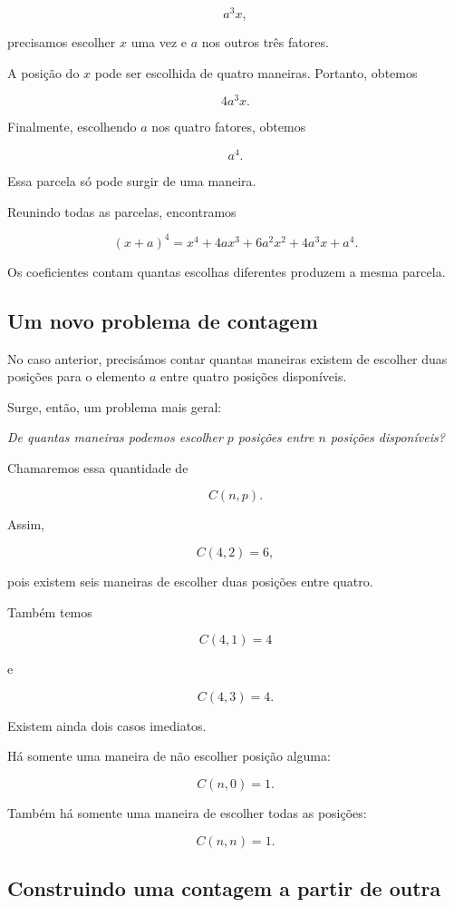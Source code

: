 \documentclass[12pt,a4paper]{article}
\begin{document}
\[
a^3x,
\]

precisamos escolher \(x\) uma vez e \(a\) nos outros três fatores.

A posição do \(x\) pode ser escolhida de quatro maneiras. Portanto,
obtemos

\[
4a^3x.
\]

Finalmente, escolhendo \(a\) nos quatro fatores, obtemos

\[
a^4.
\]

Essa parcela só pode surgir de uma maneira.

Reunindo todas as parcelas, encontramos

\[
(x+a)^4
=
x^4+4ax^3+6a^2x^2+4a^3x+a^4.
\]

Os coeficientes contam quantas escolhas diferentes produzem a mesma
parcela.

\subsection{Um novo problema de contagem}

No caso anterior, precisámos contar quantas maneiras existem de escolher
duas posições para o elemento \(a\) entre quatro posições disponíveis.

Surge, então, um problema mais geral:

\begin{center}
\emph{De quantas maneiras podemos escolher \(p\) posições entre \(n\)
posições disponíveis?}
\end{center}

Chamaremos essa quantidade de

\[
C(n,p).
\]

Assim,

\[
C(4,2)=6,
\]

pois existem seis maneiras de escolher duas posições entre quatro.

Também temos

\[
C(4,1)=4
\]

e

\[
C(4,3)=4.
\]

Existem ainda dois casos imediatos.

Há somente uma maneira de não escolher posição alguma:

\[
C(n,0)=1.
\]

Também há somente uma maneira de escolher todas as posições:

\[
C(n,n)=1.
\]

\subsection{Construindo uma contagem a partir de outra}
\end{document}
